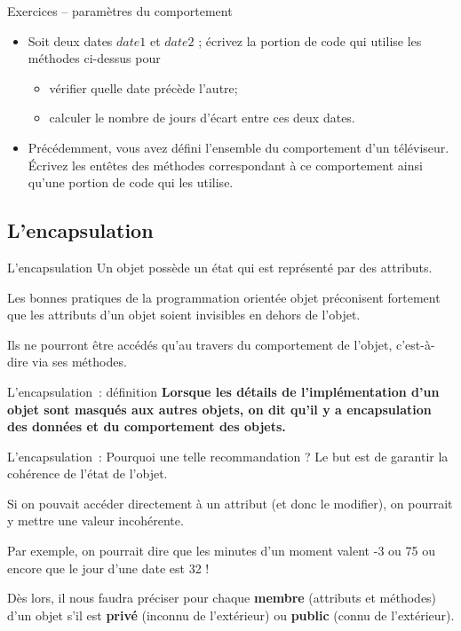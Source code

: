 \begin{frame}{Exercices – paramètres du comportement}
	\begin{itemize}
	\item 
		Soit deux dates $date1$ et $date2$ ; écrivez la
		portion de code qui utilise les méthodes ci-dessus pour
		\begin{itemize}
			\item 
				vérifier quelle date précède l'autre;
			\item 
				calculer le nombre de jours d'écart entre ces deux
				dates.
		\end{itemize}
		
	\item 
		Précédemment, vous avez défini l'ensemble du
		comportement d'un téléviseur. Écrivez les entêtes des
		méthodes correspondant à ce comportement ainsi qu'une
		portion de code qui les utilise.
	\end{itemize}
\end{frame}

\subsection{L'encapsulation}

\begin{frame}{L'encapsulation}
	Un objet possède un état qui est représenté par des attributs. 
	
	Les bonnes pratiques de la programmation orientée objet préconisent
	fortement que les attributs d'un objet soient
	invisibles en dehors de l'objet. 
	
	Ils ne pourront être accédés qu'au travers 
	du comportement de l'objet, 
	c'est-à-dire via ses méthodes.
\end{frame}

\begin{frame}{L'encapsulation~: définition}
	\textbf{Lorsque les détails de l'implémentation
		d'un objet sont masqués aux autres objets, on dit
		qu'il y a \textbf{encapsulation} des données et du
		comportement des objets.}
\end{frame}

\begin{frame}{L'encapsulation~: Pourquoi une telle recommandation ?}
	Le but est de garantir la cohérence de l'état de l'objet. 
	
	Si on pouvait accéder directement à un attribut 
	(et donc le modifier), 
	on pourrait y mettre une valeur incohérente. 
	
	Par exemple, on pourrait dire que les minutes d'un moment 
	valent -3 ou 75 ou encore que le jour d'une date est 32 !
	
	\bigskip
	
	Dès lors, il nous faudra préciser pour chaque \textbf{membre} 
	(attributs et méthodes) d'un objet s'il est
	\textbf{privé} (inconnu de l'extérieur) ou
	\textbf{public} (connu de l'extérieur). 
\end{frame}

